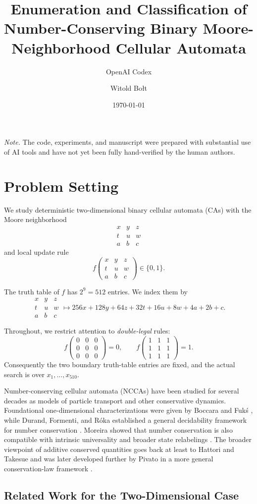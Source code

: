 \documentclass[11pt,a4paper]{article}
\title{Enumeration and Classification of Number-Conserving Binary Moore-Neighborhood Cellular Automata}
\author{OpenAI Codex \and Witold Bo\l{}t}
\date{\today}
\newcommand{\nbhd}[9]{%
  \begin{smallmatrix}
  #1 & #2 & #3 \\
  #4 & #5 & #6 \\
  #7 & #8 & #9
  \end{smallmatrix}
}
\newcommand{\F}[1]{f\!\left(#1\right)}
\begin{document}
\maketitle

\noindent\textit{Note.} The code, experiments, and manuscript were prepared with substantial
use of AI tools and have not yet been fully hand-verified by the human authors.

\bigskip
{\hypersetup{linkcolor=black}\tableofcontents}
\bigskip

\section{Problem Setting}

We study deterministic two-dimensional binary cellular automata (CAs) with the Moore
neighborhood
\[
\nbhd{x}{y}{z}{t}{u}{w}{a}{b}{c}
\]
and local update rule
\[
\F{\nbhd{x}{y}{z}{t}{u}{w}{a}{b}{c}} \in \{0,1\}.
\]

The truth table of \(f\) has \(2^9=512\) entries.  We index them by
\[
\nbhd{x}{y}{z}{t}{u}{w}{a}{b}{c}
\mapsto
256x+128y+64z+32t+16u+8w+4a+2b+c.
\]

Throughout, we restrict attention to \emph{double-legal} rules:
\[
\F{\nbhd{0}{0}{0}{0}{0}{0}{0}{0}{0}}=0,
\qquad
\F{\nbhd{1}{1}{1}{1}{1}{1}{1}{1}{1}}=1.
\]
Consequently the two boundary truth-table entries are fixed, and the actual search is over
\(x_1,\dots,x_{510}\).

Number-conserving cellular automata (NCCAs) have been studied for several decades as models of
particle transport and other conservative dynamics.  Foundational one-dimensional characterizations
were given by Boccara and Fuk\'s \cite{BoccaraFuks1998,BoccaraFuks2002}, while Durand,
Formenti, and R\'oka established a general decidability framework for number conservation
\cite{DurandFormentiRoka2003}.  Moreira showed that number conservation is also compatible with
intrinsic universality and broader state relabelings \cite{Moreira2003}.
The broader viewpoint of additive conserved quantities goes back at least to Hattori and Takesue
\cite{HattoriTakesue1991} and was later developed further by Pivato in a more general
conservation-law framework \cite{Pivato2002}.

\subsection{Related Work for the Two-Dimensional Case}
\end{document}
